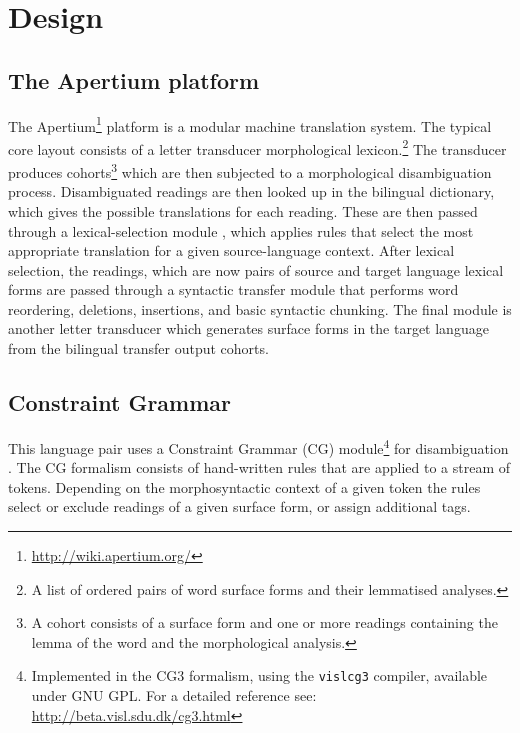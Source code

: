 \section{Design}
\subsection{The Apertium platform}
\nocite{forcada2011apertium}
The Apertium\footnote{\url{http://wiki.apertium.org/}} platform is a
modular machine translation system. The typical core layout consists
of a letter transducer morphological lexicon.\footnote{A list of
ordered pairs of word surface forms and their lemmatised
analyses.} The transducer produces cohorts\footnote{A cohort 
consists of a surface form and one or more readings containing the lemma of the 
word and the morphological analysis.} which are then subjected to a
morphological disambiguation process.
%
Disambiguated readings are then looked up in the bilingual dictionary,
which gives the possible translations for each reading. These
are then passed through a lexical-selection module \cite{tyers12a}, 
which applies rules that select the most appropriate translation
for a given source-language context.
After lexical selection, the readings, which are now pairs of source
and target language lexical forms are passed through a 
syntactic transfer module that performs word reordering, deletions,
insertions, and basic syntactic chunking.
%
The final module is another letter transducer which generates
surface forms in the target language from the bilingual transfer
output cohorts.

\subsection{Constraint Grammar}
This language pair uses a Constraint Grammar (CG)
module\footnote{Implemented in the CG3 formalism, using the
  \texttt{vislcg3} compiler, available under GNU GPL. For a detailed
  reference see: \url{http://beta.visl.sdu.dk/cg3.html}} for
disambiguation \cite{karlsson1995constraint}. The CG formalism consists of hand-written rules that
are applied to a stream of tokens. Depending on the morphosyntactic
context of a given token the rules select or exclude readings of a
given surface form, or assign additional tags.
